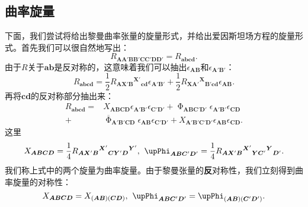 \subsection{曲率旋量}

下面，我们尝试将给出黎曼曲率张量的旋量形式，并给出爱因斯坦场方程的旋量形式。首先我们可以很自然地写出：
\begin{equation*}
	R_{\boldsymbol{AA} '\boldsymbol{BB} '\boldsymbol{CC} '\boldsymbol{DD} '} =R_{\boldsymbol{abcd}} .
\end{equation*}
由于$R$关于$\boldsymbol{ab}$是反对称的，这意味着我们可以抽出$\epsilon _{\boldsymbol{AB}}$和$\epsilon _{\boldsymbol{A} '\boldsymbol{B} '}$：
\begin{equation*}
	R_{\boldsymbol{abcd}} =\frac{1}{2} R{_{\boldsymbol{AX} '\boldsymbol{B}}}^{\boldsymbol{X} '}{}_{\boldsymbol{cd}} \epsilon _{\boldsymbol{A} '\boldsymbol{B} '} +\frac{1}{2} R{_{\boldsymbol{XA} '}}^{\boldsymbol{X}}{}_{\boldsymbol{B} '\boldsymbol{cd}} \epsilon _{\boldsymbol{AB}} .
\end{equation*}
再将$\boldsymbol{cd}$的反对称部分抽出来：
\begin{equation}
	\begin{aligned}
		R_{\boldsymbol{abcd}} = & X_{\boldsymbol{ABCD}} \epsilon _{\boldsymbol{A} '\boldsymbol{B} '} \epsilon _{\boldsymbol{C} '\boldsymbol{D} '} +\upPhi _{\boldsymbol{ABC} '\boldsymbol{D} '} \epsilon _{\boldsymbol{A} '\boldsymbol{B} '} \epsilon _{\boldsymbol{CD}}\\
		+ & \overline{\upPhi }_{\boldsymbol{A'B'CD}} \epsilon _{\boldsymbol{AB}} \epsilon _{\boldsymbol{C'D} '} +X_{\boldsymbol{A'B'C'D} '} \epsilon _{\boldsymbol{AB}} \epsilon _{\boldsymbol{CD}} .
	\end{aligned}
	\label{eq:5.53}
\end{equation}
这里
\begin{equation}
	X_{\boldsymbol{ABCD}} =\frac{1}{4} R{_{\boldsymbol{AX} '\boldsymbol{B}}}^{\boldsymbol{X} '}{}{_{\boldsymbol{CY} '\boldsymbol{D}}}^{\boldsymbol{Y} '} ,\kern+0.4em \upPhi _{\boldsymbol{ABC} '\boldsymbol{D} '} =\frac{1}{4} R{_{\boldsymbol{AX} '\boldsymbol{B}}}^{\boldsymbol{X} '}{}{_{\boldsymbol{YC} '}}^{\boldsymbol{Y}}{}_{\boldsymbol{D} '} .
	\label{eq:5.54}
\end{equation}
我们称上式中的两个旋量为曲率旋量。由于黎曼张量的\textbf{反}对称性，我们立刻得到曲率旋量的对称性：
\begin{equation}
	X_{\boldsymbol{ABCD}} =X_{(\boldsymbol{AB})(\boldsymbol{CD})} ,\kern+0.4em \upPhi _{\boldsymbol{ABC} '\boldsymbol{D} '} =\upPhi _{(\boldsymbol{AB})(\boldsymbol{C} '\boldsymbol{D} ')} .
	\label{eq:5.55}
\end{equation}
